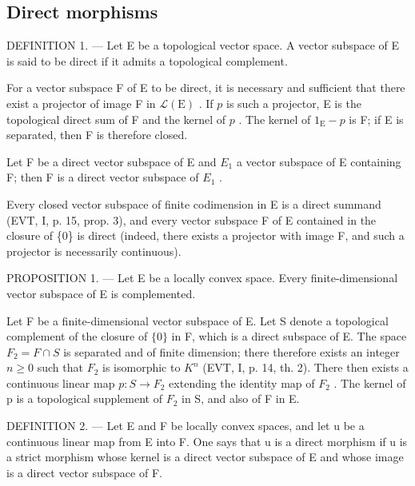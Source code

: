 \subsection{Direct morphisms}

DEFINITION 1. --- Let E be a topological vector space. A vector subspace of E is said to be direct if it admits a topological complement.

For a vector subspace F of E to be direct, it is necessary and sufficient that there exist a projector of image F in \(\mathcal{L}(\mathrm{E})\) . If \(p\) is such a projector, E is the topological direct sum of F and the kernel of \(p\) . The kernel of \(1_{\mathrm{E}} - p\) is F; if E is separated, then F is therefore closed.

Let F be a direct vector subspace of E and \(E_{1}\) a vector subspace of E containing F; then F is a direct vector subspace of \(E_{1}\) .

Every closed vector subspace of finite codimension in E is a direct summand (EVT, I, p. 15, prop. 3), and every vector subspace F of E contained in the closure of \{0\} is direct (indeed, there exists a projector with image F, and such a projector is necessarily continuous).

PROPOSITION 1. --- Let E be a locally convex space. Every finite-dimensional vector subspace of E is complemented.

Let F be a finite-dimensional vector subspace of E. Let S denote a topological complement of the closure of \(\{0\}\) in F, which is a direct subspace of E. The space \(F_{2} = F \cap S\) is separated and of finite dimension; there therefore exists an integer \(n \geqslant 0\) such that \(F_{2}\) is isomorphic to \(K^{n}\) (EVT, I, p. 14, th. 2). There then exists a continuous linear map \(p: S \to F_{2}\) extending the identity map of \(F_{2}\) . The kernel of p is a topological supplement of \(F_{2}\) in S, and also of F in E.

DEFINITION 2. --- Let E and F be locally convex spaces, and let u be a continuous linear map from E into F. One says that u is a direct morphism if u is a strict morphism whose kernel is a direct vector subspace of E and whose image is a direct vector subspace of F.

